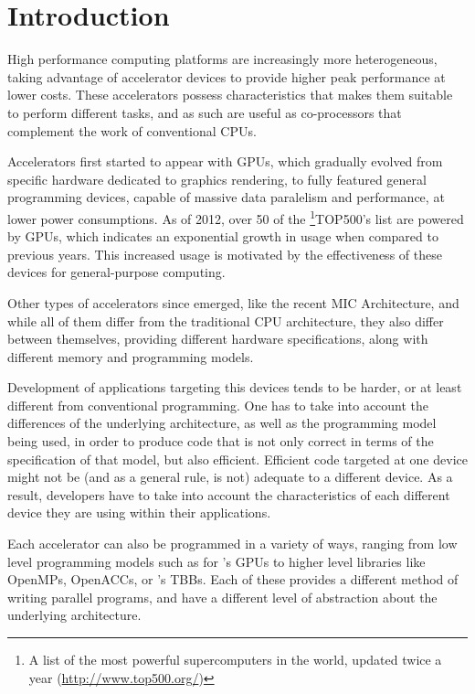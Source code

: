 \documentclass[main.tex]{subfiles}
\begin{document}
\chapter{Introduction}


High performance computing platforms are increasingly more heterogeneous, taking advantage of accelerator devices to provide higher peak performance at lower costs. These accelerators possess characteristics that makes them suitable to perform different tasks, and as such are useful as co-processors that complement the work of conventional \acp{CPU}.

Accelerators first started to appear with \acp{GPU}, which gradually evolved from specific hardware dedicated to graphics rendering, to fully featured general programming devices, capable of massive data paralelism and performance, at lower power consumptions. As of 2012, over 50 of the \footnote{A list of the most powerful supercomputers in the world, updated twice a year (\url{http://www.top500.org/})}{TOP500's} list are powered by \acp{GPU}, which indicates an exponential growth in usage when compared to previous years. This increased usage is motivated by the effectiveness of these devices for general-purpose computing. 

Other types of accelerators since emerged, like the recent \intel \ac{MIC} Architecture, and while all of them differ from the traditional \ac{CPU} architecture, they also differ between themselves, providing different hardware specifications, along with different memory and programming models. 

Development of applications targeting this devices tends to be harder, or at least different from conventional programming. One has to take into account the differences of the underlying architecture, as well as the programming model being used, in order to produce code that is not only correct in terms of the specification of that model, but also efficient. Efficient code targeted at one device might not be (and as a general rule, is not) adequate to a different device. As a result, developers have to take into account the characteristics of each different device they are using within their applications.

Each accelerator can also be programmed in a variety of ways, ranging from low level programming models such as \cuda for \nvidia's \acp{GPU} to higher level libraries like \acp{OpenMP}, \acp{OpenACC}, or \intel's \acp{TBB}. Each of these provides a different method of writing parallel programs, and have a different level of abstraction about the underlying architecture. 
\end{document}
